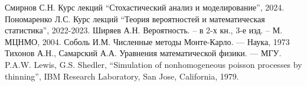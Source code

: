 \documentclass[11pt]{article}
\begin{document}
  
\begin{thebibliography}{99}
   Смирнов С.Н. Курс лекций “Стохастический анализ и моделирование”, 2024. 
    Пономаренко Л.С. Курс лекций “Теория вероятностей и математическая статистика”, 2022-2023.
   Ширяев А.Н. Вероятность. – в 2-х кн., 3-е изд. – М. МЦНМО, 2004.
   Соболь И.М. Численные методы Монте-Карло. — Наука, 1973
   Тихонов А.Н., Самарский А.А. Уравнения математической физики. — МГУ.
   P.A.W. Lewis, G.S. Shedler, “Simulation of nonhomogeneous poisson processes by thinning”, IBM Research Laboratory, San Jose, California, 1979.
\end{thebibliography}
\end{document}
